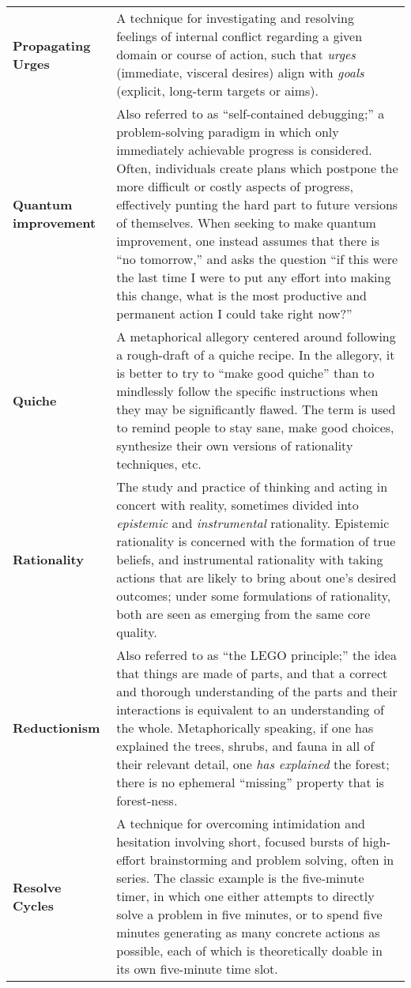 \begin{longtable} { p{} p{} }
\textbf{Propagating Urges} & A technique for investigating and resolving feelings of internal conflict regarding a given domain or course of action, such that \emph{urges} (immediate, visceral desires) align with \emph{goals} (explicit, long-term targets or aims).\\

\textbf{Quantum improvement} & Also referred to as ``self-contained debugging;'' a problem-solving paradigm in which only immediately achievable progress is considered.  Often, individuals create plans which postpone the more difficult or costly aspects of progress, effectively punting the hard part to future versions of themselves.  When seeking to make quantum improvement, one instead assumes that there is ``no tomorrow,'' and asks the question ``if this were the last time I were to put any effort into making this change, what is the most productive and permanent action I could take right now?''\\

\textbf{Quiche} & A metaphorical allegory centered around following a rough-draft of a quiche recipe.  In the allegory, it is better to try to ``make good quiche'' than to mindlessly follow the specific instructions when they may be significantly flawed.  The term is used to remind people to stay sane, make good choices, synthesize their own versions of rationality techniques, etc.\\

\textbf{Rationality} & The study and practice of thinking and acting in concert with reality, sometimes divided into \emph{epistemic} and \emph{instrumental} rationality.  Epistemic rationality is concerned with the formation of true beliefs, and instrumental rationality with taking actions that are likely to bring about one's desired outcomes; under some formulations of rationality, both are seen as emerging from the same core quality.\\

\textbf{Reductionism} & Also referred to as ``the LEGO principle;'' the idea that things are made of parts, and that a correct and thorough understanding of the parts and their interactions is equivalent to an understanding of the whole.  Metaphorically speaking, if one has explained the trees, shrubs, and fauna in all of their relevant detail, one \emph{has explained} the forest; there is no ephemeral ``missing'' property that is forest-ness.\\

\textbf{Resolve Cycles} & A technique for overcoming intimidation and hesitation involving short, focused bursts of high-effort brainstorming and problem solving, often in series.  The classic example is the five-minute timer, in which one either attempts to directly solve a problem in five minutes, or to spend five minutes generating as many concrete actions as possible, each of which is theoretically doable in its own five-minute time slot.\\


\end{longtable}
